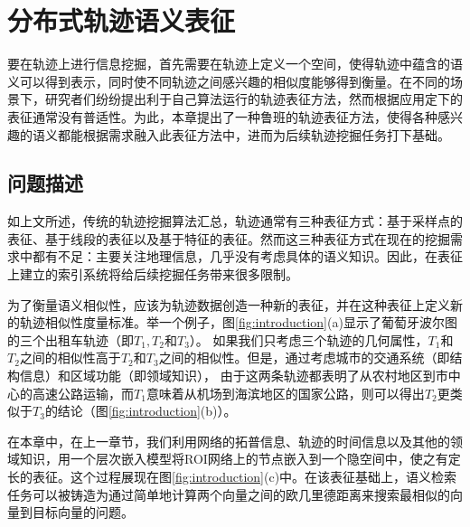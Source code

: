 
\chapter{分布式轨迹语义表征}
\label{chapter:main2}

要在轨迹上进行信息挖掘，首先需要在轨迹上定义一个空间，使得轨迹中蕴含的语义可以得到表示，同时使不同轨迹之间感兴趣的相似度能够得到衡量。在不同的场景下，研究者们纷纷提出利于自己算法运行的轨迹表征方法，然而根据应用定下的表征通常没有普适性。为此，本章提出了一种鲁班的轨迹表征方法，使得各种感兴趣的语义都能根据需求融入此表征方法中，进而为后续轨迹挖掘任务打下基础。


\section{问题描述}
如上文所述，传统的轨迹挖掘算法汇总，轨迹通常有三种表征方式：基于采样点的表征、基于线段的表征以及基于特征的表征。然而这三种表征方式在现在的挖掘需求中都有不足：主要关注地理信息，几乎没有考虑具体的语义知识。因此，在表征上建立的索引系统将给后续挖掘任务带来很多限制。

为了衡量语义相似性，应该为轨迹数据创造一种新的表征，并在这种表征上定义新的轨迹相似性度量标准。举一个例子，图\ref{fig:introduction}(a)显示了葡萄牙波尔图的三个出租车轨迹（即$ T_1, T_2$和$T_3 $）。 如果我们只考虑三个轨迹的几何属性，$ T_1 $和$ T_2 $之间的相似性高于$ T_2 $和$ T_3 $之间的相似性。但是，通过考虑城市的交通系统（即结构信息）和区域功能（即领域知识）， 由于这两条轨迹都表明了从农村地区到市中心的高速公路运输，而$T_1$意味着从机场到海滨地区的国家公路，则可以得出$ T_2 $更类似于$ T_3 $的结论（图\ref{fig:introduction}(b)）。

在本章中，在上一章节，我们利用网络的拓普信息、轨迹的时间信息以及其他的领域知识，用一个层次嵌入模型将ROI网络上的节点嵌入到一个隐空间中，使之有定长的表征。这个过程展现在图\ref{fig:introduction}(c)中。在该表征基础上，语义检索任务可以被铸造为通过简单地计算两个向量之间的欧几里德距离来搜索最相似的向量到目标向量的问题。

